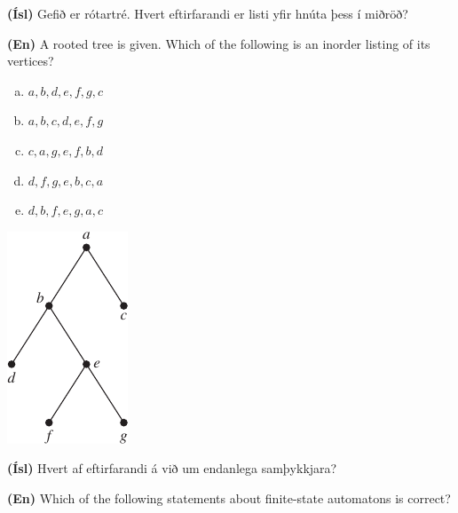 \documentclass[addpoints]{exam}
\begin{document}
\begin{questions}
\newpage

\question[3] 

\begin{multicols}{2}
    \textbf{(Ísl)} Gefið er rótartré. Hvert eftirfarandi er listi yfir hnúta þess í miðröð?
    
    \textbf{(En)} A rooted tree is given. Which of the following is an inorder listing of its vertices?

    \begin{enumerate}[a)]
        \item $a, b, d, e, f, g, c$ %
        \item $a, b, c, d, e, f, g$ %
        \item $c, a, g, e, f, b, d$
        \item $d, f, g, e, b, c, a$ %
        \item $d, b, f, e, g, a, c$ %
    \end{enumerate}
    \begin{center}
        \includegraphics[width=0.5\linewidth]{Pics/exam-tree}
    \end{center}
\end{multicols}

\question[3]

\textbf{(Ísl)} Hvert af eftirfarandi á við um endanlega samþykkjara?

\textbf{(En)} Which of the following statements about finite-state automatons is correct?


\end{questions}
\end{document}
